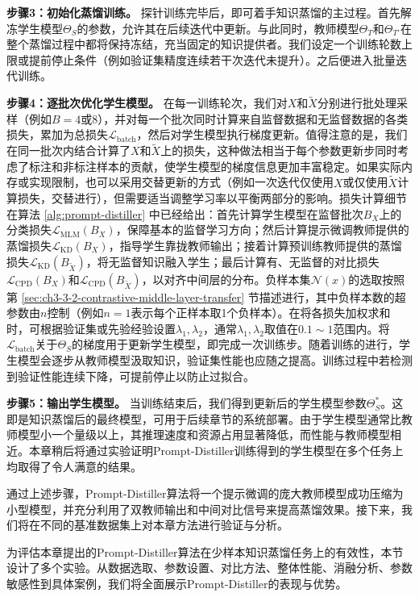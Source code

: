 \documentclass[../main.tex]{subfiles}
\begin{document}
\textbf{步骤3：初始化蒸馏训练。} 探针训练完毕后，即可着手知识蒸馏的主过程。首先解冻学生模型$\Theta_S$的参数，允许其在后续迭代中更新。与此同时，教师模型$\Theta_T$和$\Theta_{T'}$在整个蒸馏过程中都将保持冻结，充当固定的知识提供者。我们设定一个训练轮数上限或提前停止条件（例如验证集精度连续若干次迭代未提升）。之后便进入批量迭代训练。

\textbf{步骤4：逐批次优化学生模型。} 在每一训练轮次，我们对$X$和$\tilde{X}$分别进行批处理采样（例如$B=4$或8），并对每一个批次同时计算来自监督数据和无监督数据的各类损失，累加为总损失$\mathcal{L}_{\text{batch}}$，然后对学生模型执行梯度更新。值得注意的是，我们在同一批次内结合计算了$X$和$\tilde{X}$上的损失，这种做法相当于每个参数更新步同时考虑了标注和非标注样本的贡献，使学生模型的梯度信息更加丰富稳定。如果实际内存或实现限制，也可以采用交替更新的方式（例如一次迭代仅使用$X$或仅使用$\tilde{X}$计算损失，交替进行），但需要适当调整学习率以平衡两部分的影响。损失计算细节在算法 \ref{alg:prompt-distiller} 中已经给出：首先计算学生模型在监督批次$B_X$上的分类损失$\mathcal{L}_{\text{MLM}}(B_X)$，保障基本的监督学习方向；然后计算提示微调教师提供的蒸馏损失$\mathcal{L}_{\text{KD}}(B_X)$，指导学生靠拢教师输出；接着计算预训练教师提供的蒸馏损失$\mathcal{L}_{\text{KD}}(B_{\tilde{X}})$，将无监督知识融入学生；最后计算有、无监督的对比损失$\mathcal{L}_{\text{CPD}}(B_X)$和$\mathcal{L}_{\text{CPD}}(B_{\tilde{X}})$，以对齐中间层的分布。负样本集$\mathcal{N}(x)$的选取按照第 \ref{sec:ch3-3-2-contrastive-middle-layer-transfer} 节描述进行，其中负样本数的超参数由$n$控制（例如$n=1$表示每个正样本取1个负样本）。在将各损失加权求和时，可根据验证集或先验经验设置$\lambda_1,\lambda_2$，通常$\lambda_1,\lambda_2$取值在$0.1\sim1$范围内。将$\mathcal{L}_{\text{batch}}$关于$\Theta_S$的梯度用于更新学生模型，即完成一次训练步。随着训练的进行，学生模型会逐步从教师模型汲取知识，验证集性能也应随之提高。训练过程中若检测到验证性能连续下降，可提前停止以防止过拟合。

\textbf{步骤5：输出学生模型。} 当训练结束后，我们得到更新后的学生模型参数$\Theta_S^*$。这即是知识蒸馏后的最终模型，可用于后续章节的系统部署。由于学生模型通常比教师模型小一个量级以上，其推理速度和资源占用显著降低，而性能与教师模型相近。本章稍后将通过实验证明Prompt-Distiller训练得到的学生模型在多个任务上均取得了令人满意的结果。

通过上述步骤，Prompt-Distiller算法将一个提示微调的庞大教师模型成功压缩为小型模型，并充分利用了双教师输出和中间对比信号来提高蒸馏效果。接下来，我们将在不同的基准数据集上对本章方法进行验证与分析。

\label{sec:ch3-5-experiments-and-analysis}
为评估本章提出的Prompt-Distiller算法在少样本知识蒸馏任务上的有效性，本节设计了多个实验。从数据选取、参数设置、对比方法、整体性能、消融分析、参数敏感性到具体案例，我们将全面展示Prompt-Distiller的表现与优势。
\end{document}
